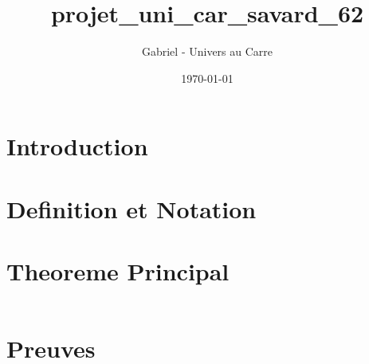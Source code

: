\documentclass[12pt]{article}
\title{projet_uni_car_savard_62}
\author{Gabriel - Univers au Carre}
\date{\today}
\begin{document}
\maketitle


\section{Introduction}



\section{Definition et Notation}



\section{Theoreme Principal}


\begin{equation}
\end{equation}


\section{Preuves}


\end{document}
